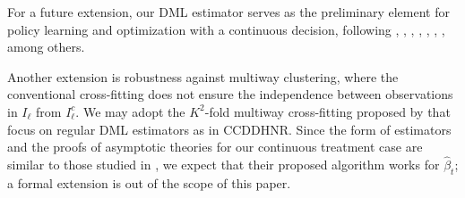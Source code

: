 \documentclass[lettersize, 12pt]{article}
\begin{document}
  

For a future extension, our DML estimator serves as the preliminary element for policy learning and optimization with a continuous decision, following \cite{Manski04}, \cite{HiranoPorter}, \cite{KT18ECMA}, \cite{Kallus}, \cite{DSLC}, \cite{AW_PL}, \cite{Farrell18}, among others. 

Another extension is robustness against multiway clustering, where the conventional cross-fitting does not ensure the independence between observations in $I_\ell$ from $I_\ell^c$.
We may adopt the $K^2$-fold multiway cross-fitting proposed by \cite{Chiang} that focus on regular DML estimators as in CCDDHNR. 
Since the form of estimators and the proofs of asymptotic theories for our continuous treatment case are similar to those studied in \cite{Chiang}, we expect that their proposed algorithm works for $\hat \beta_t$; a formal extension is out of the scope of this paper. 
\end{document}
